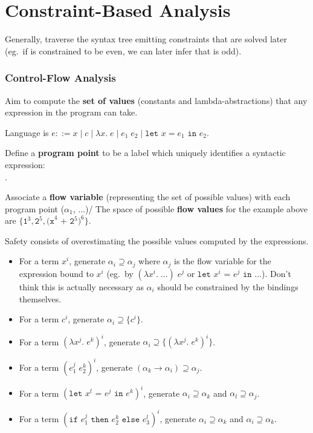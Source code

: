 \documentclass[a4paper, 11pt]{article}
\begin{document}
\section*{Constraint-Based Analysis}
{
    Generally, traverse the syntax tree emitting constraints that are solved later (eg.\ if  is constrained to be even, we can later infer that  is odd).

    \subsubsection*{Control-Flow Analysis}
    {
        Aim to compute the \textbf{set of values} (constants and lambda-abstractions) that any expression in the program can take.

        Language is \(e ::= x \mid c \mid \lambda x.\;e \mid e_1\;e_2 \mid \texttt{let }x = e_1 \texttt{ in } e_2\).

        Define a \textbf{program point} to be a label which uniquely identifies a syntactic expression:\\ .

        Associate a \textbf{flow variable} (representing the set of possible values) with each program point (\(\alpha_1\), ...)/ The space of possible \textbf{flow values} for the example above are \(\{\texttt{1}^3, \texttt{2}^5, \texttt{(x}^4\texttt{ + 2}^5\texttt{)}^6\}\).

        Safety consists of overestimating the possible values computed by the expressions.

        \begin{itemize}
        \item For a term \(x^i\), generate \(\alpha_i \supseteq \alpha_j\) where \(\alpha_j\) is the flow variable for the expression bound to \(x^i\) (eg.\ by \((\lambda x^i.\;...)\;e^j\) or \(\texttt{let }x^i\texttt{ = }e^j\texttt{ in }...\)). Don't think this is actually necessary as \(\alpha_i\) should be constrained by the bindings themselves.
        \item For a term \(c^i\), generate \(\alpha_i \supseteq \{c^i\}\).
        \item For a term \((\lambda x^j.\;e^k)^i\), generate \(\alpha_i \supseteq \{(\lambda x^j.\;e^k)^i\}\).
        \item For a term \((e_1^j\;e_2^k)^i\), generate \((\alpha_k \rightarrow \alpha_i) \supseteq \alpha_j\).
        \item For a term \((\texttt{let }x^l\texttt{ = }e^j\texttt{ in }e^k)^i\), generate \(\alpha_i \supseteq \alpha_k\) and \(\alpha_l \supseteq \alpha_j\).
        \item For a term \((\texttt{if }e_1^j\texttt{ then }e_2^k\texttt{ else }e_3^l)^i\), generate \(\alpha_i \supseteq \alpha_k\) and \(\alpha_i \supseteq \alpha_k\).
        \end{itemize}

}}
\end{document}

